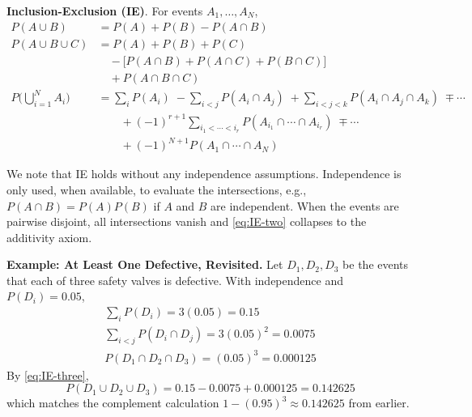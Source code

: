\begin{definitionBox}
\textbf{Inclusion-Exclusion (IE)}. For events $A_1,\dots,A_N$,
\begin{align}
    P(A\cup B) &= P(A)+P(B)-P(A\cap B) \label{eq:IE-two}\\[4pt]
    P(A\cup B\cup C) &= P(A)+P(B)+P(C) \nonumber\\
    &\quad - \big[P(A\cap B)+P(A\cap C)+P(B\cap C)\big] \nonumber\\
    &\quad + P(A\cap B\cap C) \label{eq:IE-three}\\[4pt]
    P\!\Big(\bigcup_{i=1}^N A_i\Big) &= \sum_{i} P(A_i)
    \;-\!\!\sum_{i<j} P(A_i\cap A_j)
    \;+\!\!\sum_{i<j<k} P(A_i\cap A_j\cap A_k)
    \;\mp \cdots \nonumber\\
    &\qquad + (-1)^{r+1}\!\!\!\sum_{i_1<\cdots<i_r}\!\!\! P(A_{i_1}\cap\cdots\cap A_{i_r})
    \;\mp \cdots \nonumber\\
    &\qquad + (-1)^{N+1} P(A_1\cap\cdots\cap A_N)\label{eq:IE-general}
\end{align}
\end{definitionBox}
We note that IE holds without any independence assumptions. Independence is only used, when available, to evaluate the intersections, e.g., $P(A\cap B)=P(A)P(B)$ if $A$ and $B$ are independent. When the events are pairwise disjoint, all intersections vanish and \autoref{eq:IE-two} collapses to the additivity axiom.

\begin{exampleBox}
\textbf{Example: At Least One Defective, Revisited.}
Let $D_1,D_2,D_3$ be the events that each of three safety valves is defective. With independence and $P(D_i)=0.05$,
\begin{gather}
    \sum_i P(D_i)=3(0.05)=0.15 \\
    \sum_{i<j} P(D_i\cap D_j)=3(0.05)^2=0.0075 \\
    P(D_1\cap D_2\cap D_3)=(0.05)^3=0.000125
\end{gather}
By \autoref{eq:IE-three},
\begin{equation}
    P(D_1\cup D_2\cup D_3)=0.15-0.0075+0.000125=0.142625
\end{equation}
which matches the complement calculation $1-(0.95)^3 \approx 0.142625$ from earlier.
\end{exampleBox}


